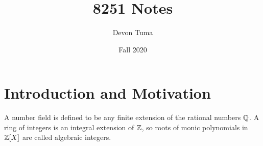 \documentclass[11pt]{article}
\title{8251 Notes}
\author{Devon Tuma}
\date{Fall 2020}
\begin{document}
\maketitle

\section*{Introduction and Motivation}

\begin{definition}
  A number field is defined to be any finite extension of the rational numbers $\mathbb{Q}$. A ring of integers is an integral extension of $\mathbb{Z}$, so roots of monic polynomials in $\mathbb{Z}[X]$ are called algebraic integers.
\end{definition}
\end{document}
